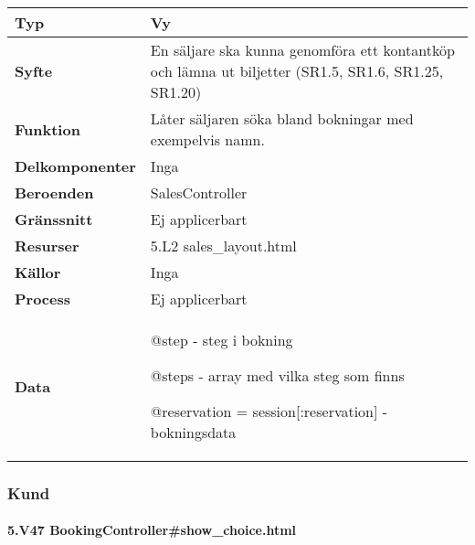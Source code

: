 \documentclass[a4paper, twoside, 11pt, titlepage]{article}
\begin{document}
			\begin {table} [ht] \begin{tabular} {  p{3.5cm} p{11.6cm} }
				\hline
				{\sffamily\textbf{Typ}} & {Vy} \\
				\hline
				{\sffamily\textbf{Syfte}} & {En säljare ska kunna genomföra ett kontantköp och lämna ut biljetter (SR1.5, SR1.6, SR1.25, SR1.20)} \\
				\hline
				{\sffamily\textbf{Funktion}} & {Låter säljaren söka bland bokningar med exempelvis namn.} \\
				\hline
				{\sffamily\textbf{Delkomponenter}} & {Inga} \\
				\hline
				{\sffamily\textbf{Beroenden}} & {SalesController} \\
				\hline
				{\sffamily\textbf{Gränssnitt}} & {Ej applicerbart} \\
				\hline
				{\sffamily\textbf{Resurser}} & {5.L2 sales\_layout.html} \\
				\hline
				{\sffamily\textbf{Källor}} & {Inga} \\
				\hline
				{\sffamily\textbf{Process}} & {Ej applicerbart} \\
				\hline
				{\sffamily\textbf{Data}} & {@step - steg i bokning

@steps - array med vilka steg som finns

@reservation = session[:reservation] - bokningsdata} \\
				\hline
			\end{tabular} \end{table} \FloatBarrier


		\subsubsection{Kund}



			\paragraph{5.V47 BookingController\#show\_choice.html}\
\end{document}
